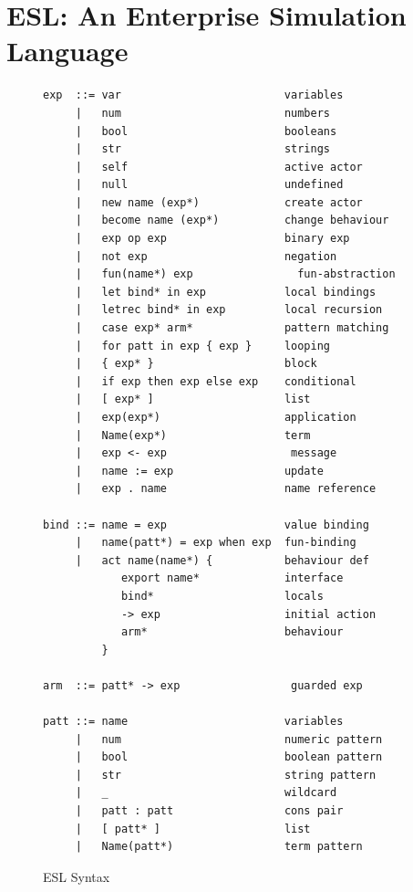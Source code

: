 \documentclass[10pt,numbers]{sigplanconf}
\begin{document}
\section{ESL: An Enterprise Simulation Language}

\label{sec:ESL}

\begin{figure}
\begin{lstlisting}
exp  ::= var                         variables
     |   num                         numbers
     |   bool                        booleans
     |   str                         strings
     |   self                        active actor
     |   null                        undefined
     |   new name (exp*)             create actor
     |   become name (exp*)          change behaviour
     |   exp op exp                  binary exp
     |   not exp                     negation
     |   fun(name*) exp                fun-abstraction
     |   let bind* in exp            local bindings
     |   letrec bind* in exp         local recursion
     |   case exp* arm*              pattern matching
     |   for patt in exp { exp }     looping
     |   { exp* }                    block
     |   if exp then exp else exp    conditional
     |   [ exp* ]                    list
     |   exp(exp*)                   application
     |   Name(exp*)                  term
     |   exp <- exp                   message
     |   name := exp                 update
     |   exp . name                  name reference
     
bind ::= name = exp                  value binding
     |   name(patt*) = exp when exp  fun-binding
     |   act name(name*) {           behaviour def
            export name*             interface
            bind*                    locals
            -> exp                   initial action
            arm*                     behaviour
         }
            
arm  ::= patt* -> exp                 guarded exp

patt ::= name                        variables
     |   num                         numeric pattern
     |   bool                        boolean pattern
     |   str                         string pattern
     |   _                           wildcard
     |   patt : patt                 cons pair
     |   [ patt* ]                   list
     |   Name(patt*)                 term pattern
\end{lstlisting}
\caption{ESL Syntax}
\label{fig:esl_syntax}
\end{figure}
\end{document}
